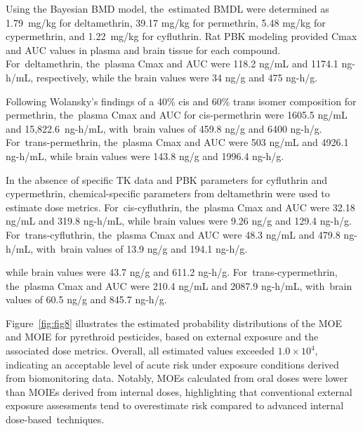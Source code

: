 \documentclass[toxics,article,accept,pdftex,moreauthors]{Definitions/mdpi}
\begin{document}
Using the Bayesian BMD model, the~estimated BMDL were determined as 1.79~mg/kg for deltamethrin,
39.17 mg/kg for permethrin, 5.48 mg/kg for cypermethrin, and 1.22~mg/kg
for cyfluthrin. Rat PBK modeling provided Cmax and AUC values in plasma
and brain tissue for each compound. For~deltamethrin, the~plasma Cmax
and AUC were 118.2 ng/mL and 1174.1 ng-h/mL, respectively, while the
brain values were 34 ng/g and 475 ng-h/g.

Following Wolansky's findings of a 40\% cis and 60\% trans isomer
composition for permethrin, the~plasma Cmax and AUC for cis-permethrin
were 1605.5 ng/mL and \mbox{15,822.6 ng-h/mL}, with~brain values of 459.8 ng/g
and 6400 ng-h/g. For~trans-permethrin, the~plasma Cmax and AUC were 503
ng/mL and 4926.1 ng-h/mL, while brain values were 143.8 ng/g and 1996.4
ng-h/g.

In the absence of specific TK data and PBK parameters
for cyfluthrin and cypermethrin, chemical-specific parameters from
deltamethrin were used to estimate dose metrics. For~cis-cyfluthrin, the~plasma Cmax and AUC were 32.18 ng/mL and 319.8 ng-h/mL, while brain
values were 9.26 ng/g and 129.4 ng-h/g. For~trans-cyfluthrin, the~plasma
Cmax and AUC were 48.3 ng/mL and 479.8 ng-h/mL, with~brain values of
13.9 ng/g and 194.1 ng-h/g.

 while brain values were 43.7 ng/g and 611.2 ng-h/g. For~trans-cypermethrin, the~plasma Cmax and AUC were 210.4 ng/mL and 2087.9
ng-h/mL, with~brain values of 60.5 ng/g and 845.7 ng-h/g.

Figure~\ref{fig:fig8} illustrates the estimated probability
distributions of the MOE and MOIE for pyrethroid pesticides, based on
external exposure and the associated dose metrics. Overall, all
estimated values exceeded \(1.0 \times 10^{4}\), indicating an
acceptable level of acute risk under exposure conditions derived from
biomonitoring data. Notably, MOEs calculated from oral doses were lower
than MOIEs derived from internal doses, highlighting that conventional
external exposure assessments tend to overestimate risk compared to
advanced internal dose-based~techniques.
\end{document}
